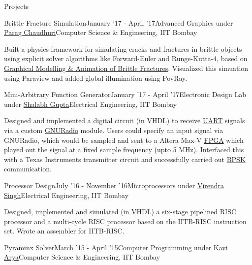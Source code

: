 \documentclass{resume} %
\begin{document}
\begin{rSection}{Projects}
\begin{rSubsection}{Brittle Fracture Simulation}{January '17 - April '17}{Advanced Graphics under \href{https://www.cse.iitb.ac.in/~paragc/}{Parag Chaudhuri}}{Computer Science \& Engineering, IIT Bombay}
\item Built a physics framework for simulating cracks and fractures in brittle objects using explicit solver algorithms like Forward-Euler and Runge-Kutta-4, based on \href{http://graphics.berkeley.edu/papers/Obrien-GMA-1999-08/}{Graphical Modelling \& Animation of Brittle Fractures}. Visualized this simuation using Paraview and added global illumination using PovRay.
\end{rSubsection}
\begin{rSubsection}{Mini-Arbitrary Function Generator}{January '17 - April '17}{Electronic Design Lab under \href{https://www.ee.iitb.ac.in/wiki/faculty/shalabh}{Shalabh Gupta}}{Electrical Engineering, IIT Bombay}
\item Designed and implemented a digital circuit (in VHDL) to receive \href{https://en.wikipedia.org/wiki/Universal_asynchronous_receiver-transmitter}{UART} signals via a custom \href{https://www.gnuradio.org/}{GNURadio} module. Users could specify an input signal via GNURadio, which would be sampled and sent to a Altera Max-V \href{https://en.wikipedia.org/wiki/Field-programmable_gate_array}{FPGA} which played out the signal at a fixed sample frequency (upto 5 MHz). Interfaced this with a Texas Instruments transmitter circuit and successfully carried out \href{http://www.rfwireless-world.com/Terminology/BPSK.html}{BPSK} communication.
\end{rSubsection}
\begin{rSubsection}{Processor Design}{July '16 - November '16}{Microprocessors under \href{https://www.ee.iitb.ac.in/~viren/}{Virendra Singh}}{Electrical Engineering, IIT Bombay}
\item Designed, implemented and simulated (in VHDL) a six-stage pipelined RISC processor and a multi-cycle RISC processor based on the IITB-RISC instruction set. Wrote an assembler for IITB-RISC.
\end{rSubsection}
\begin{rSubsection}{Pyraminx Solver}{March '15 - April '15}{Computer Programming under \href{https://www.cse.iitb.ac.in/~kavi/}{Kavi Arya}}{Computer Science \& Engineering, IIT Bombay}

\end{rSubsection}
\end{rSection}
\end{document}
